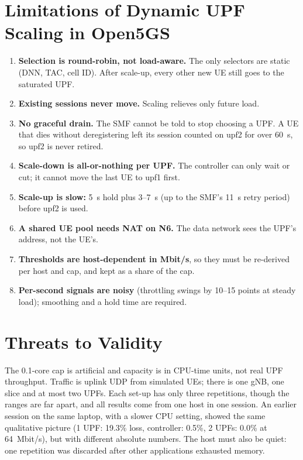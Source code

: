 \documentclass[conference]{IEEEtran}
\begin{document}
\section{Limitations of Dynamic UPF Scaling in Open5GS}\label{sec:limits}
\begin{enumerate}
\item \textbf{Selection is round-robin, not load-aware.} The only selectors are static (DNN, TAC, cell ID). After scale-up, every other new UE still goes to the saturated UPF.
\item \textbf{Existing sessions never move.} Scaling relieves only future load.
\item \textbf{No graceful drain.} The SMF cannot be told to stop choosing a UPF. A UE that dies without deregistering left its session counted on upf2 for over 60~s, so upf2 is never retired.
\item \textbf{Scale-down is all-or-nothing per UPF.} The controller can only wait or cut; it cannot move the last UE to upf1 first.
\item \textbf{Scale-up is slow:} 5~s hold plus 3--7~s (up to the SMF's 11~s retry period) before upf2 is used.
\item \textbf{A shared UE pool needs NAT on N6.} The data network sees the UPF's address, not the UE's.
\item \textbf{Thresholds are host-dependent in Mbit/s}, so they must be re-derived per host and cap, and kept as a share of the cap.
\item \textbf{Per-second signals are noisy} (throttling swings by 10--15 points at steady load); smoothing and a hold time are required.
\end{enumerate}

\section{Threats to Validity}
The 0.1-core cap is artificial and capacity is in CPU-time units, not real UPF throughput. Traffic is uplink UDP from simulated UEs; there is one gNB, one slice and at most two UPFs. Each set-up has only three repetitions, though the ranges are far apart, and all results come from one host in one session. An earlier session on the same laptop, with a slower CPU setting, showed the same qualitative picture (1 UPF: 19.3\% loss, controller: 0.5\%, 2 UPFs: 0.0\% at 64~Mbit/s), but with different absolute numbers. The host must also be quiet: one repetition was discarded after other applications exhausted memory.
\end{document}
